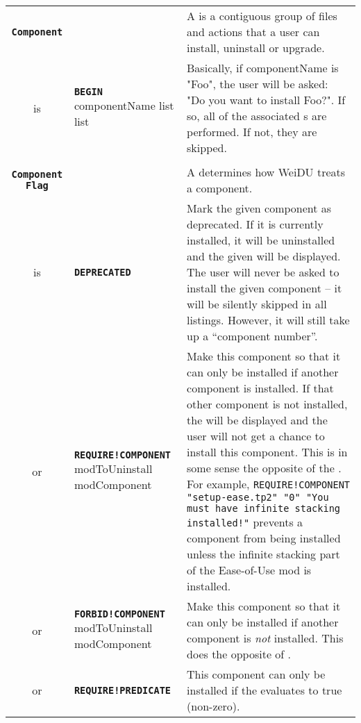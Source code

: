 \documentclass{article}
\def\ttref#1{\ahrefloc{#1}{\tt #1}}
\def\DEFINE#1{{\tt \bf #1}\label{#1}\index{#1}}
\def\DEFSYN#1{{\tt \bf #1}\index{#1}}
\def\t#1{{\tt #1}}
\def\Slist{{\color{red} list }}
\begin{document}
\begin{tabular}{cp{10in}|p{10in}}
\DEFINE{Component} & &
  A \ttref{Component} is a contiguous group of files and actions that a
  user can install, uninstall or upgrade. \\

  is & \DEFSYN{BEGIN} componentName
    \ttref{Component Flag} \Slist
    \ttref{TP2 Action} \Slist &
    Basically, if componentName is "Foo", the user will be asked: "Do you
    want to install Foo?". If so, all of the associated \ttref{TP2 Action}s
    are performed. If not, they are skipped. \\

\\

\DEFINE{Component Flag} &&
  A \ttref{Component Flag} determines how WeiDU treats a component. \\

  is & \DEFINE{DEPRECATED} \ttref{String} &
      Mark the given component as deprecated. If it is currently installed,
      it will be uninstalled and the given \ttref{String} will be
      displayed. The user will never be asked to install the given
      component -- it will be silently skipped in all listings. However, it
      will still take up a ``component number''. \\

  or & \DEFINE{REQUIRE!COMPONENT} modToUninstall modComponent
      \ttref{String} &
      Make this component so that it can only be installed if another
      component is installed. If that other component is not installed, the
      \ttref{String} will be displayed and the user will not get a chance
      to install this component. This is in some sense the opposite of the
      \ttref{UNINSTALL} \ttref{TP2 Action}. For example,
      \t{REQUIRE!COMPONENT "setup-ease.tp2" "0" "You must have infinite
      stacking installed!"} prevents a component from being installed
      unless the infinite stacking part of the Ease-of-Use mod is
      installed.  \\

  or & \DEFINE{FORBID!COMPONENT} modToUninstall modComponent
      \ttref{String} &
      Make this component so that it can only be installed if another
      component is \emph{not} installed. This does the opposite of
      \ttref{REQUIRE!COMPONENT}.  \\

  or & \DEFINE{REQUIRE!PREDICATE} \ttref{value} \ttref{String} &
      This component can only be installed if the \ttref{value}
      evaluates to true (non-zero). \\


\end{tabular}
\end{document}
